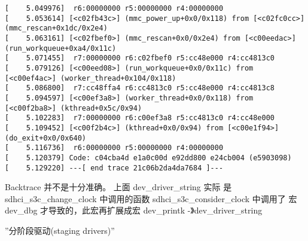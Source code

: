 \documentclass[a4paper,titlepage]{article}
\begin{document}
\begin{lstlisting}[basicstyle=\tiny, caption=oops log]
[    5.049976]  r6:00000000 r5:00000000 r4:00000000 
[    5.053614] [<c02fb43c>] (mmc_power_up+0x0/0x118) from [<c02fc0cc>] (mmc_rescan+0x1dc/0x2e4) 
[    5.063161] [<c02fbef0>] (mmc_rescan+0x0/0x2e4) from [<c00eedac>] (run_workqueue+0xa4/0x11c) 
[    5.071455]  r7:00000000 r6:c02fbef0 r5:cc48e000 r4:cc4813c0 
[    5.079126] [<c00eed08>] (run_workqueue+0x0/0x11c) from [<c00ef4ac>] (worker_thread+0x104/0x118) 
[    5.086800]  r7:cc48ffa4 r6:cc4813c0 r5:cc48e000 r4:cc4813c8 
[    5.094597] [<c00ef3a8>] (worker_thread+0x0/0x118) from [<c00f2ba8>] (kthread+0x5c/0x94) 
[    5.102283]  r7:00000000 r6:c00ef3a8 r5:cc4813c0 r4:cc48e000 
[    5.109452] [<c00f2b4c>] (kthread+0x0/0x94) from [<c00e1f94>] (do_exit+0x0/0x640) 
[    5.116736]  r6:00000000 r5:00000000 r4:00000000 
[    5.120379] Code: c04cba4d e1a0c00d e92dd800 e24cb004 (e5903098) 
[    5.129220] ---[ end trace 21c06b2da4da7684 ]--- 
\end{lstlisting}
Backtrace 并不是十分准确。 上面  dev_driver_string 实际 是  sdhci_s3c_change_clock 中调用的函数 sdhci_s3c_consider_clock 中调用了 宏dev_dbg 才导致的，此宏再扩展成宏    dev_printk -》dev_driver_string

”分阶段驱动(staging drivers)”
\end{document}
